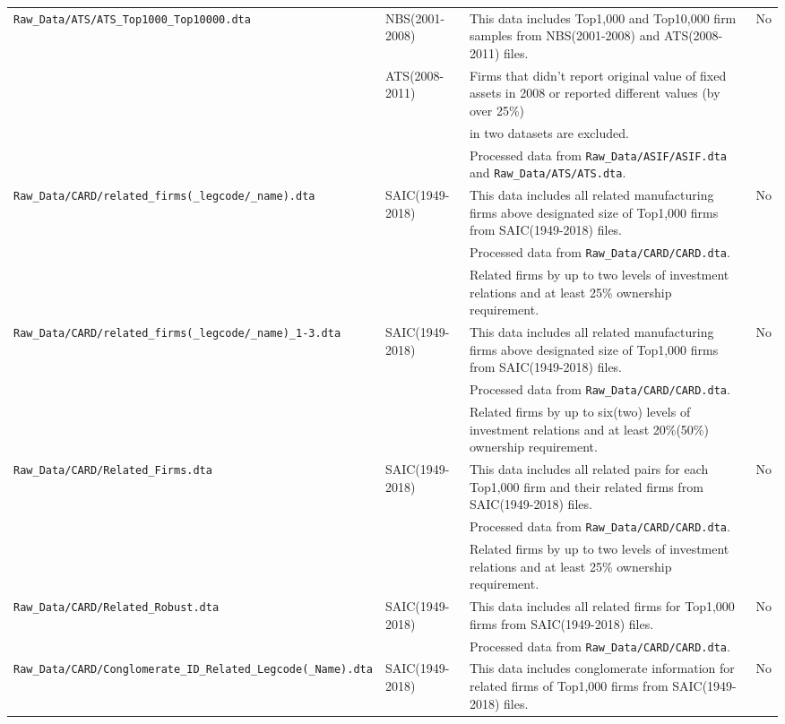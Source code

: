 \documentclass[12pt,notitlepage]{article}
\begin{document}
\begin{landscape}
\begin{table}[htbp]
{\begin{tabular}{llll}
\texttt{Raw\_Data/ATS/ATS\_Top1000\_Top10000.dta} & NBS(2001-2008) & This data includes Top1,000 and Top10,000 firm samples from NBS(2001-2008) and ATS(2008-2011) files. & No \\
		& ATS(2008-2011)&  Firms that didn't report original value of fixed assets in 2008 or reported different values (by over 25\%) \\
		&& in two datasets are excluded.\\ 
		&& Processed data from \texttt{Raw\_Data/ASIF/ASIF.dta} and \texttt{Raw\_Data/ATS/ATS.dta}. \\	
\texttt{Raw\_Data/CARD/related\_firms(\_legcode/\_name).dta} & SAIC(1949-2018) & This data includes all related manufacturing firms above designated size of Top1,000 firms from SAIC(1949-2018) files. & No \\
		&& Processed data from \texttt{Raw\_Data/CARD/CARD.dta}. \\
		&& Related firms by up to two levels of investment relations and at least 25\% ownership requirement. \\		
\texttt{Raw\_Data/CARD/related\_firms(\_legcode/\_name)\_1-3.dta} & SAIC(1949-2018) & This data includes all related manufacturing firms above designated size of Top1,000 firms from SAIC(1949-2018) files. & No \\		
		&& Processed data from \texttt{Raw\_Data/CARD/CARD.dta}. \\
		&& Related firms by up to six(two) levels of investment relations and at least 20\%(50\%) ownership requirement. \\	
\texttt{Raw\_Data/CARD/Related\_Firms.dta} & SAIC(1949-2018) & This data includes all related pairs for each Top1,000 firm and their related firms from SAIC(1949-2018) files. & No \\
		&& Processed data from \texttt{Raw\_Data/CARD/CARD.dta}. \\
		&& Related firms by up to two levels of investment relations and at least 25\% ownership requirement. \\
\texttt{Raw\_Data/CARD/Related\_Robust.dta} & SAIC(1949-2018) & This data includes all related firms for Top1,000 firms from SAIC(1949-2018) files. & No \\	
		&& Processed data from \texttt{Raw\_Data/CARD/CARD.dta}. \\	
\texttt{Raw\_Data/CARD/Conglomerate\_ID\_Related\_Legcode(\_Name).dta} & SAIC(1949-2018) & This data includes conglomerate information for related firms of Top1,000 firms from SAIC(1949-2018) files. & No \\

\end{tabular}}
\end{table}
\end{landscape}
\end{document}
